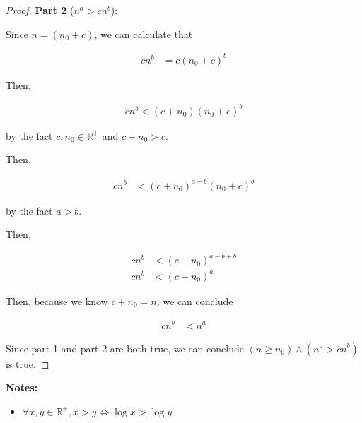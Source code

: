 \documentclass[12pt]{article}
\begin{document}
\begin{enumerate}[a.]
\begin{proof}
    \textbf{Part 2} ($n^a > cn^b$):

    \bigskip

    Since $n = (n_0 + c)$, we can calculate that

    \begin{align}
        cn^b &= c(n_0 + c)^b
    \end{align}

    \bigskip

    Then,

    \begin{align}
        cn^b < (c + n_0)(n_0 + c)^b
    \end{align}

    by the fact $c,n_0 \in \mathbb{R}^{+}$ and $c + n_0 > c$.

    \bigskip

    Then,

    \begin{align}
        cn^b &< (c + n_0)^{a-b}(n_0 + c)^b
    \end{align}

    by the fact $a > b$.

    \bigskip

    Then,

    \begin{align}
        cn^b &< (c + n_0)^{a-b+b}\\
        cn^b &< (c + n_0)^{a}
    \end{align}

    \bigskip

    Then, because we know $c + n_0 = n$, we can conclude

    \begin{align}
        cn^b &< n^a
    \end{align}

    \bigskip

    Since part 1 and part 2 are both true, we can conclude $(n \geq n_0) \land (n^a > cn^b)$ is true.

    \end{proof}

    \bigskip

    \textbf{Notes:}

    \begin{itemize}
        \item
        $\forall x,y \in \mathbb{R}^{+}, x > y \Leftrightarrow \log x > \log y$
    \end{itemize}

\end{enumerate}
\end{document}
